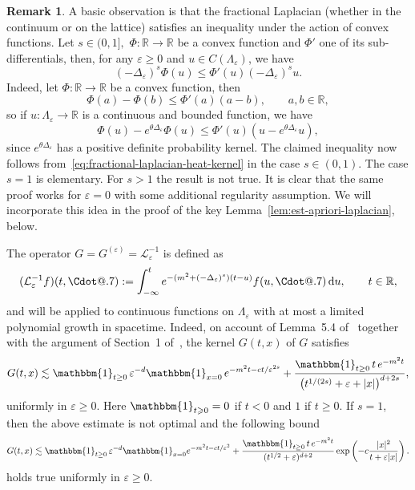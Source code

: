 \documentclass{article}
\makeatletter
\numberwithin{equation}{section}
\newcommand{\assign}{:=}
\newcommand{\mathd}{\mathrm{d}}
\newcommand*\Cdot{{\mathpalette\Cdot@{.7}}}
\newcommand*\Cdot@[2]{\mathbin{\vcenter{\hbox{\scalebox{#2}{\hspace{0.1mm}$\m@th#1\bullet$\hspace{0.1mm}}}}}}
\theoremstyle{plain}
\theoremstyle{definition}
\newtheorem{remark}[theorem]{Remark}
\makeatother
\begin{document}
\begin{remark}
  A basic observation is that the fractional Laplacian (whether in the
  continuum or on the lattice) satisfies an inequality under the action of
  convex functions. Let $s \in (0, 1],$ $\Phi : \mathbb{R} \rightarrow
  \mathbb{R}$ be a convex function and $\Phi'$ one of its sub-differentials,
  then, for any $\varepsilon \geqslant 0$ and $u \in C
  (\Lambda_{\varepsilon})$, we have
  \[ (- \Delta_{\varepsilon})^s \Phi (u) \leqslant \Phi' (u)  (-
     \Delta_{\varepsilon})^s u. \]
  Indeed, let $\Phi : \mathbb{R} \rightarrow \mathbb{R}$ be a convex function,
  then
  \[ \Phi (a) - \Phi (b) \leqslant \Phi' (a)  (a - b), \qquad a, b \in
     \mathbb{R}, \]
  so if $u : \Lambda_{\varepsilon} \rightarrow \mathbb{R}$ is a continuous and
  bounded function, we have
  \[ \Phi (u) - e^{\theta \Delta_{\varepsilon}} \Phi (u) \leqslant \Phi' (u) 
     (u - e^{\theta \Delta_{\varepsilon}} u), \]
  since $e^{\theta \Delta_{\varepsilon}}$ has a positive definite probability
  kernel. The claimed inequality now follows
  from~\eqref{eq:fractional-laplacian-heat-kernel} in the case
  $s \in (0, 1)$. The case $s = 1$ is elementary. For $s > 1$ the result is
  not true. It is clear that the same proof works for $\varepsilon = 0$
  with some additional regularity assumption. We will
  incorporate this idea in the proof of the key
  Lemma~\ref{lem:est-apriori-laplacian}, below.
\end{remark}

The operator $G = G^{(\varepsilon)} =\mathcal{L}^{- 1}_{\varepsilon}$ is
defined as
\begin{equation}
  (\mathcal{L}^{- 1}_{\varepsilon} f) (t, \Cdot) \assign \int_{- \infty}^t
  e^{- (m^2 + (- \Delta_{\varepsilon})^s)  (t - u)} f (u, \Cdot)\,\mathd u,
  \qquad t \in \mathbb{R}, \label{eq:ell-minus-one}
\end{equation}
and will be applied to continuous functions on $\Lambda_{\varepsilon}$ with at
most a limited polynomial growth in spacetime. Indeed, on account of Lemma~5.4
of~{\cite{Grigoryan-heat-kernel-metric-meas-sp}} together with the argument of
Section~1 of~{\cite{Grigoryan-Telcs-Sub-Gaussian-estimates}}, the kernel $G  (t,
x)$ of $G$ satisfies
\begin{equation}\label{eq:est-kernel-G}
	G(t,x)
	\lesssim
	\mathbbm{1}_{{t\geq0}}\,\varepsilon^{-d}\mathbbm{1}_{{x=0}}\,
	e^{-m^2t-ct/\varepsilon^{2s}}
	+
	\frac{\mathbbm{1}_{{t\geq0}}\,t\,e^{-m^2t}}
	{\bigl(t^{1/(2s)}+\varepsilon+|x|\bigr)^{d+2s}},
\end{equation}
uniformly in $\varepsilon \geqslant 0$. Here
$\mathbbm{1}_{t \geqslant 0} = 0$ if $t < 0$ and $1$
if $t \geqslant 0$. If $s = 1$, then the above estimate is not optimal and the
following bound
\begin{equation}\label{eq:est-kernel-G-s-1}
	G(t,x)
	\lesssim
	\mathbbm{1}_{{t\geq0}}\,\varepsilon^{-d}\mathbbm{1}_{{x=0}}
	e^{-m^2t-ct/\varepsilon^2}
	+
	\frac{\mathbbm{1}_{{t\geq0}}\,t\, e^{-m^2t}}{( t^{1/2}+\varepsilon)^{d+2}}
	\exp\left(
	-c\frac{|x|^2}{t+\varepsilon|x|}
	\right).
\end{equation}
holds true uniformly in $\varepsilon \geqslant 0$.
\end{document}

